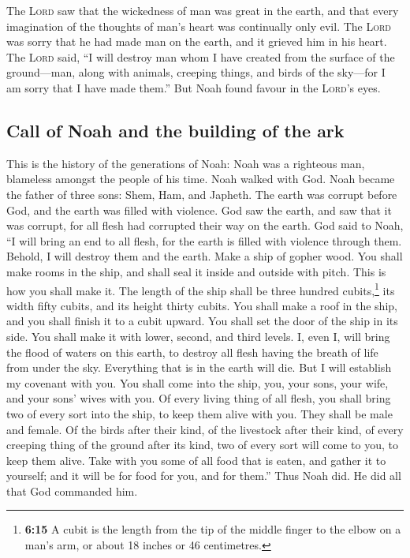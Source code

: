  The \textsc{Lord} saw that the wickedness of man was
great in the earth, and that every imagination of the thoughts of man's
heart was continually only evil.  The \textsc{Lord} was
sorry that he had made man on the earth, and it grieved him in his
heart.  The \textsc{Lord} said, ``I will destroy man whom
I have created from the surface of the ground---man, along with animals,
creeping things, and birds of the sky---for I am sorry that I have made
them.''  But Noah found favour in the \textsc{Lord}'s
eyes.

\hypertarget{call-of-noah-and-the-building-of-the-ark}{%
\subsection{Call of Noah and the building of the
ark}\label{call-of-noah-and-the-building-of-the-ark}}

 This is the history of the generations of Noah: Noah was
a righteous man, blameless amongst the people of his time. Noah walked
with God.  Noah became the father of three sons: Shem,
Ham, and Japheth.  The earth was corrupt before God, and
the earth was filled with violence.  God saw the earth,
and saw that it was corrupt, for all flesh had corrupted their way on
the earth.  God said to Noah, ``I will bring an end to
all flesh, for the earth is filled with violence through them. Behold, I
will destroy them and the earth.  Make a ship of gopher
wood. You shall make rooms in the ship, and shall seal it inside and
outside with pitch.  This is how you shall make it. The
length of the ship shall be three hundred cubits,\footnote{\textbf{6:15}
  A cubit is the length from the tip of the middle finger to the elbow
  on a man's arm, or about 18 inches or 46 centimetres.} its width fifty
cubits, and its height thirty cubits.  You shall make a
roof in the ship, and you shall finish it to a cubit upward. You shall
set the door of the ship in its side. You shall make it with lower,
second, and third levels.  I, even I, will bring the
flood of waters on this earth, to destroy all flesh having the breath of
life from under the sky. Everything that is in the earth will die.
 But I will establish my covenant with you. You shall
come into the ship, you, your sons, your wife, and your sons' wives with
you.  Of every living thing of all flesh, you shall bring
two of every sort into the ship, to keep them alive with you. They shall
be male and female.  Of the birds after their kind, of
the livestock after their kind, of every creeping thing of the ground
after its kind, two of every sort will come to you, to keep them alive.
 Take with you some of all food that is eaten, and gather
it to yourself; and it will be for food for you, and for them.''
 Thus Noah did. He did all that God commanded him.

